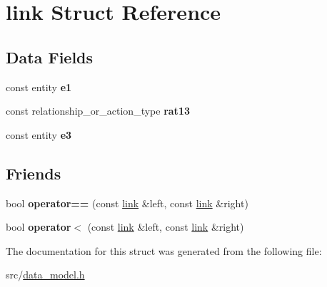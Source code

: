 \hypertarget{structlink}{}\section{link Struct Reference}
\label{structlink}
\subsection*{Data Fields}
\begin{DoxyCompactItemize}
\item 
\mbox{\label{structlink_a5a3eda51498d357ce568579c1518ddc0}} 
const entity {\bfseries e1}
\item 
\mbox{\label{structlink_a926504798d48f1e25b0c5217ef96bd9a}} 
const relationship\+\_\+or\+\_\+action\+\_\+type {\bfseries rat13}
\item 
\mbox{\label{structlink_ab87c26d64d781c9173d767772a45e9f0}} 
const entity {\bfseries e3}
\end{DoxyCompactItemize}
\subsection*{Friends}
\begin{DoxyCompactItemize}
\item 
\mbox{\label{structlink_a383e61e15072ef3fe9e16102dea483e0}} 
bool {\bfseries operator==} (const \hyperlink{structlink}{link} \&left, const \hyperlink{structlink}{link} \&right)
\item 
\mbox{\label{structlink_af79bc13140c8180154526642748b0c33}} 
bool {\bfseries operator$<$} (const \hyperlink{structlink}{link} \&left, const \hyperlink{structlink}{link} \&right)
\end{DoxyCompactItemize}


The documentation for this struct was generated from the following file\+:\begin{DoxyCompactItemize}
\item 
src/\hyperlink{data__model_8h}{data\+\_\+model.\+h}\end{DoxyCompactItemize}
